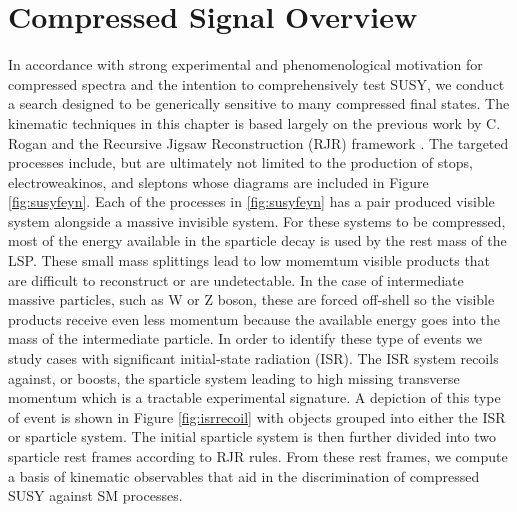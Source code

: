 \section{Compressed Signal Overview}
In accordance with strong experimental and phenomenological motivation for compressed spectra and the intention to comprehensively test SUSY, we conduct a search designed to be generically sensitive to many compressed final states. The kinematic techniques in this chapter is based largely on the previous work by C. Rogan and the Recursive Jigsaw Reconstruction (RJR) framework \cite{AN}\cite{PhysRevD.96.112007}. The targeted processes include, but are ultimately not limited to the production of stops, electroweakinos, and sleptons whose diagrams are included in Figure \ref{fig:susyfeyn}.  
Each of the processes in \ref{fig:susyfeyn} has a pair produced visible system alongside a massive invisible system. For these systems to be compressed, most of the energy available in the sparticle decay is used by the rest mass of the LSP. These small mass splittings lead to low momemtum visible products that are difficult to reconstruct or are undetectable. In the case of intermediate massive particles, such as W or Z boson, these are forced off-shell so the visible products receive even less momentum because the available energy goes into the mass of the intermediate particle. In order to identify these type of events we study cases with significant initial-state radiation (ISR). The ISR system recoils against, or boosts, the sparticle system leading to high missing transverse momentum which is a tractable experimental signature. A depiction of this type of event is shown in Figure \ref{fig:isrrecoil} with objects grouped into either the ISR or sparticle system. The initial sparticle system is then further divided into two sparticle rest frames according to RJR rules. From these rest frames, we compute a basis of kinematic observables that aid in the discrimination of compressed SUSY against SM processes.

